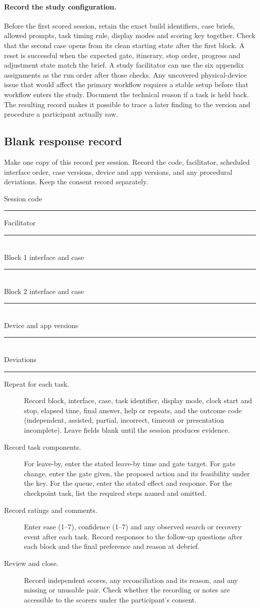 \documentclass[sigconf,nonacm,balance=false]{acmart}
\begin{document}
\paragraph{Record the study configuration.} Before the first scored session, retain the exact build identifiers, case briefs, allowed prompts, task timing rule, display modes and scoring key together. Check that the second case opens from its clean starting state after the first block. A reset is successful when the expected gate, itinerary, stop order, progress and adjustment state match the brief. A study facilitator can use the six appendix assignments as the run order after those checks. Any uncovered physical-device issue that would affect the primary workflow requires a stable setup before that workflow enters the study. Document the technical reason if a task is held back. The resulting record makes it possible to trace a later finding to the version and procedure a participant actually saw.

\subsection{Blank response record}
Make one copy of this record per session. Record the code, facilitator, scheduled interface order, case versions, device and app versions, and any procedural deviations. Keep the consent record separately.

\noindent Session code \rule{1.1cm}{.4pt} \quad Facilitator \rule{1.1cm}{.4pt}\\
Block 1 interface and case \rule{2.8cm}{.4pt}\\
Block 2 interface and case \rule{2.8cm}{.4pt}\\
Device and app versions \rule{3cm}{.4pt}\\
Deviations \rule{5cm}{.4pt}

\begin{description}
\item[Repeat for each task.] Record block, interface, case, task identifier, display mode, clock start and stop, elapsed time, final answer, help or repeats, and the outcome code (independent, assisted, partial, incorrect, timeout or presentation incomplete). Leave fields blank until the session produces evidence.
\item[Record task components.] For leave-by, enter the stated leave-by time and gate target. For gate change, enter the gate given, the proposed action and its feasibility under the key. For the queue, enter the stated effect and response. For the checkpoint task, list the required steps named and omitted.
\item[Record ratings and comments.] Enter ease (1--7), confidence (1--7) and any observed search or recovery event after each task. Record responses to the follow-up questions after each block and the final preference and reason at debrief.
\item[Review and close.] Record independent scores, any reconciliation and its reason, and any missing or unusable pair. Check whether the recording or notes are accessible to the scorers under the participant's consent.
\end{description}
\end{document}
